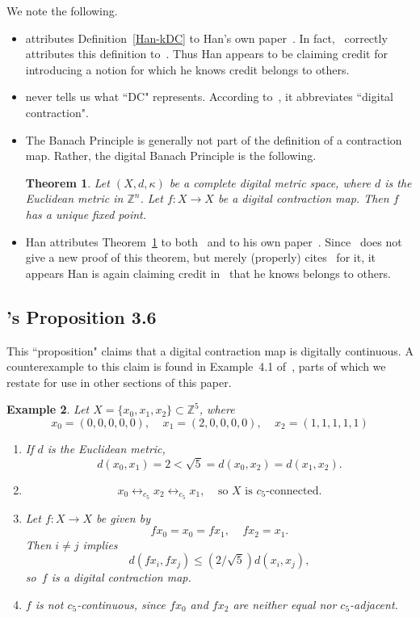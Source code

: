\documentclass{article}
\newtheorem{thm}{Theorem}
\newtheorem{exl}[thm]{Example}
\numberwithin{thm}{section}
\newcommand{\adj}{\leftrightarrow}
\def\Z{{\mathbb Z}}
\begin{document}
We note the following.
\begin{itemize}
    \item \cite{Han19} attributes Definition~\ref{Han-kDC} to Han's own paper~\cite{HanBan}. 
    In fact,~\cite{HanBan} correctly
    attributes this definition to~\cite{EgeKaraca-Ban}.
    Thus Han appears to be 
    claiming credit for introducing 
    a notion for which he
    knows credit
    belongs to others.
    \item \cite{Han19} never tells us what ``DC" 
    represents. According to~\cite{EgeKaraca-Ban}, it
    abbreviates ``digital contraction".
\item The Banach Principle is generally not part of the definition of
a contraction map.
Rather, the digital Banach 
Principle is the following.
\begin{thm}
\label{DBPthm}
    {\rm \cite{EgeKaraca-Ban}}
    Let $(X, d, \kappa)$ be a complete digital metric space, where
$d$ is the Euclidean metric in $\Z^n$. Let $f : X \to X$ be a digital contraction map.
Then $f$ has a unique fixed point.
\end{thm}
\item Han attributes
Theorem~\ref{DBPthm} to 
both~\cite{EgeKaraca-Ban}
and to his own paper~\cite{HanBan}.
Since~\cite{HanBan} does not give a new proof of this
theorem, but merely (properly) 
cites~\cite{EgeKaraca-Ban} 
for it, it appears Han is again
claiming credit in~\cite{Han19}
that he knows belongs to others.
\end{itemize}

\subsection{\cite{Han19}'s Proposition 3.6}
\label{discontSec}
This ``proposition" claims that
a digital contraction map is
digitally continuous. A
counterexample to this claim
is found in Example~4.1
of~\cite{BxSt19}, parts of which we
restate for use in other sections 
of this paper.
\begin{exl}
   {\rm \cite{BxSt19}}
   \label{counterHan5.1}
    Let $X=\{x_0,x_1,x_2\} \subset \Z^5$,
    where
    \[ x_0=(0,0,0,0,0),~~~~~
    x_1=(2,0,0,0,0),~~~~~
    x_2=(1,1,1,1,1)
    \]
    \begin{enumerate}
        \item If $d$ is
    the Euclidean metric,
    \[ d(x_0,x_1) = 2 < \sqrt{5} = d(x_0,x_2) = d(x_1,x_2).\]
    \item
    \[ x_0 \adj_{c_5} x_2
    \adj_{c_5} x_1,
    ~~~~~
    \mbox{so $X$ is $c_5$-connected.}
    \]
    \item  Let $f: X \to X$
    be given by
    \[fx_0 = x_0 = fx_1,~~~~~fx_2 = x_1.\]
    Then $i \neq j$ implies
    \begin{equation}
    \label{BxStExlIneq}
    d(fx_i,fx_j) \le (2/\sqrt{5})d(x_i,x_j), 
    \end{equation}
    so~$f$ is
    a digital contraction map.
    \item $f$ is not $c_5$-continuous, 
    since $fx_0$ and
    $fx_2$ are neither equal nor
    $c_5$-adjacent.
    \end{enumerate}
\end{exl}
\end{document}
